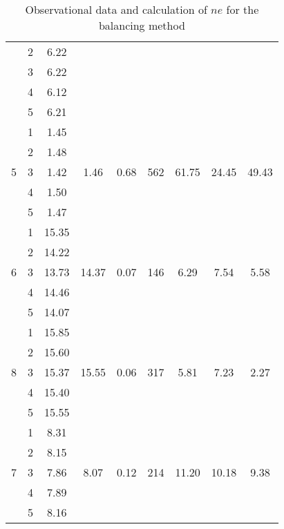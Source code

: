 \begin{table*}[]
\begin{tabular}{|c|c|c|c|c|c|c|c|c|}
     & 2 & 6.22 &  &  &  &  &  &  \\ \cline{2-3}
     & 3 & 6.22 &  &  &  &  &  &  \\ \cline{2-3}
     & 4 & 6.12 &  &  &  &  &  &  \\ \cline{2-3}
     & 5 & 6.21 &  &  &  &  &  &  \\ \hline
    \multirow{5}{*}{5} & 1 & 1.45 & \multirow{5}{*}{1.46} & \multirow{5}{*}{0.68} & \multirow{5}{*}{562} & \multirow{5}{*}{61.75} & \multirow{5}{*}{24.45} & \multirow{5}{*}{49.43} \\ \cline{2-3}
     & 2 & 1.48 &  &  &  &  &  &  \\ \cline{2-3}
     & 3 & 1.42 &  &  &  &  &  &  \\ \cline{2-3}
     & 4 & 1.50 &  &  &  &  &  &  \\ \cline{2-3}
     & 5 & 1.47 &  &  &  &  &  &  \\ \hline
    \multirow{5}{*}{6} & 1 & 15.35 & \multirow{5}{*}{14.37} & \multirow{5}{*}{0.07} & \multirow{5}{*}{146} & \multirow{5}{*}{6.29} & \multirow{5}{*}{7.54} & \multirow{5}{*}{5.58} \\ \cline{2-3}
     & 2 & 14.22 &  &  &  &  &  &  \\ \cline{2-3}
     & 3 & 13.73 &  &  &  &  &  &  \\ \cline{2-3}
     & 4 & 14.46 &  &  &  &  &  &  \\ \cline{2-3}
     & 5 & 14.07 &  &  &  &  &  &  \\ \hline
    \multirow{5}{*}{8} & 1 & 15.85 & \multirow{5}{*}{15.55} & \multirow{5}{*}{0.06} & \multirow{5}{*}{317} & \multirow{5}{*}{5.81} & \multirow{5}{*}{7.23} & \multirow{5}{*}{2.27} \\ \cline{2-3}
     & 2 & 15.60 &  &  &  &  &  &  \\ \cline{2-3}
     & 3 & 15.37 &  &  &  &  &  &  \\ \cline{2-3}
     & 4 & 15.40 &  &  &  &  &  &  \\ \cline{2-3}
     & 5 & 15.55 &  &  &  &  &  &  \\ \hline
    \multirow{5}{*}{7} & 1 & 8.31 & \multirow{5}{*}{8.07} & \multirow{5}{*}{0.12} & \multirow{5}{*}{214} & \multirow{5}{*}{11.20} & \multirow{5}{*}{10.18} & \multirow{5}{*}{9.38} \\ \cline{2-3}
     & 2 & 8.15 &  &  &  &  &  &  \\ \cline{2-3}
     & 3 & 7.86 &  &  &  &  &  &  \\ \cline{2-3}
     & 4 & 7.89 &  &  &  &  &  &  \\ \cline{2-3}
     & 5 & 8.16 &  &  &  &  &  &  \\ \hline
    \end{tabular}%
    \caption{Observational data and calculation of $ne$ for the balancing method}
    \label{obs2}    
\end{table*}